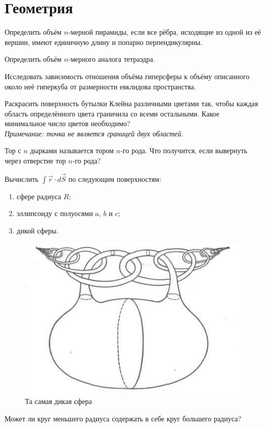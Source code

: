     \chapter{Геометрия}
    \begin{problem}
        Определить объём \(n\)-мерной пирамиды, если все рёбра, исходящие из
        одной из её вершин, имеют единичную длину и попарно перпендикулярны.
    \end{problem}
    \begin{problem}
        Определить объём \(n\)-мерного аналога тетраэдра.
    \end{problem}
    \begin{problem}
        Исследовать зависимость отношения объёма гиперсферы к объёму описанного
        около неё гиперкуба от размерности евклидова пространства.
    \end{problem}
    \begin{problem}
        Раскрасить поверхность бутылки Клейна различными цветами так, чтобы
        каждая область определённого цвета граничила со всеми остальными.
        Какое минимальное число цветов необходимо?\\
        \textit{Примечание: точка не является границей двух областей.}
    \end{problem}
    \begin{problem}
        Тор с \(n\) дырками называется тором \(n\)-го рода. Что получится, если
        вывернуть через отверстие тор \(n\)-го рода?
    \end{problem}
    \begin{problem}
        Вычислить \( \int \vec{r} \cdot d\vec{S} \) по следующим
        поверхностям:
        \begin{enumerate}
            \item сфере радиуса \( R \);
            \item эллипсоиду с полуосями \( a \), \( b \) и \( c \);
            \item дикой сферы.
        \end{enumerate}
        \begin{figure}[h]
            \centering
            \includegraphics[width=0.5\linewidth]{images/wild-sphere}
            \caption{Та самая дикая сфера}
            \label{fig:wild-sphere}
        \end{figure}
    \end{problem}
    \begin{problem}
        Может ли круг меньшего радиуса содержать в себе круг большего радиуса?
    \end{problem}
